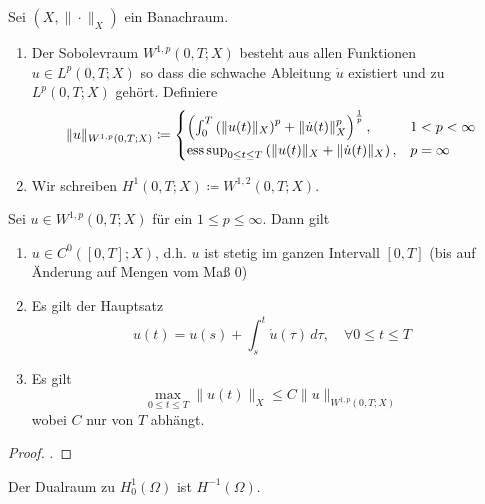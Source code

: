 \documentclass[../skript.tex]{subfiles}
\begin{document}

\begin{definition}\label{def:c4e2s4}
	Sei $(X,\|\cdot\|_X)$ ein Banachraum.
 	\begin{enumerate}
 		\item Der Sobolevraum $W^{1,p}(0,T;X)$ besteht aus allen Funktionen $u\in L^p(0,T;X)$
 			so dass die schwache Ableitung $\dot{u}$ existiert und zu $L^p(0,T;X)$ gehört. Definiere 
 			\[
 				\|u\|_{W^{1,p}(0,T;X)} \coloneqq 
 				\begin{cases} 
 					\left(\int_0^T\left(\|u(t)\|_X\right)^p + \|\dot{u}(t)\|_X^p\right)^{\frac{1}{p}} ,&1<p<\infty \\
 					\operatorname*{ess\,sup}_{0\leq t\leq T} \left( \|u(t)\|_X + \|\dot{u}(t)\|_X\right ), &p=\infty
 				\end{cases}
 			\]
 		\item Wir schreiben $H^1(0,T;X) \coloneqq W^{1,2}(0,T;X)$.
 	\end{enumerate}
\end{definition}

\begin{theorem}\label{thm:c4s2s5}
	Sei $u\in W^{1,p}(0,T;X)$ für ein $1\leq p\leq\infty$. Dann gilt
	\begin{enumerate}
		\item $u\in C^0([0,T];X)$, d.h. $u$ ist stetig im ganzen Intervall $[0,T]$ (bis auf Änderung auf Mengen vom Maß $0$)
		\item Es gilt der Hauptsatz
			\[
				u(t) = u(s) + \int_s^t \dot{u}(\tau)\,d\tau,\quad\forall 0\leq t\leq T
			\]
		\item Es gilt 
			\[
				\max_{0\leq t\leq T} \|u(t)\|_X \leq C\|u\|_{W^{1,p}(0,T;X)}
			\]
			wobei $C$ nur von $T$ abhängt. 
	\end{enumerate}
\end{theorem}

\begin{proof}
	\cite[S.286]{Evans}.
\end{proof}

\begin{remark*}
	Der Dualraum zu $H^1_0(\Omega)$ ist $H^{-1}(\Omega)$.
\end{remark*}
\end{document}
